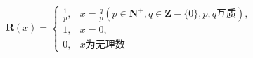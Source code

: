 \[
\mathbf{R}(x)=\begin{cases}
\frac{1}{p},&x=\frac{q}{p}(p\in \mathbf{N}^{+},q\in \mathbf{Z}-\{0\},p,q\text{互质}),\\
1,&x=0,\\
0,&x\text{为无理数}
\end{cases}
\]